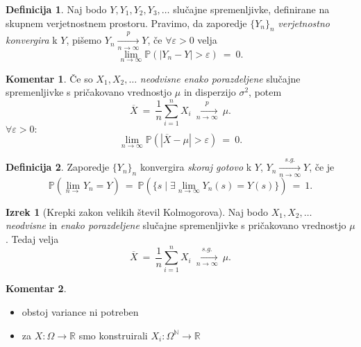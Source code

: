 \documentclass[11pt]{article}
\newcommand{\p}{\mathbb{P}}
\newcommand{\R}{\mathbb{R}}
\newcommand{\1}{\mathbbm{1}}
\newcommand{\N}{\mathbb{N}}
\theoremstyle{definition}
\newtheorem{definicija}{Definicija}[section]
\theoremstyle{definition}
\theoremstyle{definition}
\newtheorem{izrek}{Izrek}[section]
\newtheorem*{komentar}{Komentar}
\begin{document}
\begin{definicija}

Naj bodo $Y, Y_1, Y_2, Y_3, \ldots$ slučajne spremenljivke, definirane na skupnem verjetnostnem prostoru. Pravimo, da zaporedje $\{Y_n\}_n$ \textit{verjetnostno konvergira} k $Y$, pišemo $Y_n \xrightarrow[n \rightarrow \infty]{p} Y$, če $\forall \varepsilon > 0$ velja
$$\lim_{n \rightarrow \infty} \p(|Y_n - Y| > \varepsilon) ~=~ 0.$$

\end{definicija}
\vspace{0.5cm}

\begin{komentar}

Če so $X_1, X_2, \ldots$ \textit{neodvisne enako porazdeljene} slučajne spremenljivke s pričakovano vrednostjo $\mu$ in disperzijo $\sigma^2$, potem
$$\overline{X} ~=~ \frac{1}{n} \sum_{i=1}^n X_i ~\xrightarrow[n \rightarrow \infty]{p}~ \mu.$$
$\forall \varepsilon > 0:$
$$\lim_{n \rightarrow \infty} \p(|\overline{X} - \mu| > \varepsilon) ~=~ 0.$$

\end{komentar}
\vspace{0.5cm}

\begin{definicija}

Zaporedje $\{Y_n\}_n$ konvergira \textit{skoraj gotovo} k $Y$, $Y_n \xrightarrow[n \rightarrow \infty]{s.g.} Y$, če je
$$\p(\lim_{n \rightarrow} Y_n = Y) ~=~ \p(\{ s \mid \exists \lim_{n \rightarrow \infty} Y_n(s) = Y(s) \}) ~=~ 1.$$ 

\end{definicija}
\vspace{0.5cm}

\begin{izrek}[Krepki zakon velikih števil Kolmogorova]

Naj bodo $X_1, X_2, \ldots$ \textit{neodvisne} in  \textit{enako porazdeljene} slučajne spremenljivke s pričakovano vrednostjo $\mu$. Tedaj velja
$$\overline{X} ~=~ \frac{1}{n} \sum_{i=1}^n X_i ~\xrightarrow[n \rightarrow \infty]{s.g.}~ \mu.$$

\end{izrek}
\vspace{0.5cm}

\begin{komentar}
\begin{itemize}
	\item obstoj variance ni potreben
	\item za $X: \Omega \rightarrow \R$ smo konstruirali $X_i: \Omega^{\N} \rightarrow \R$
\end{itemize}
\end{komentar}
\vspace{0.5cm}
\end{document}

